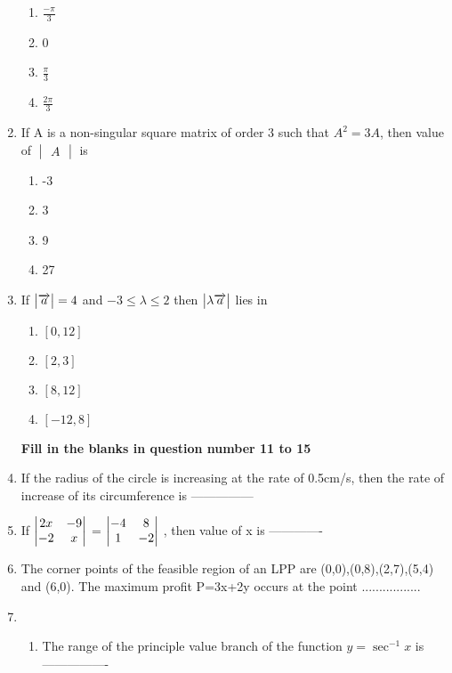 \documentclass[journal,12pt,twocolumn]{IEEEtran}
\renewcommand\thesection{\arabic{section}}
\begin{document}
\begin{enumerate}[label=\thesection.\arabic*.,ref=\thesection.\theenumi]
\begin{enumerate}
    \item $\frac{-\pi}{3}$
    \item 0
    \item $\frac{\pi}{3}$
    \item $\frac{2\pi}{3}$
\end{enumerate}

\item  If A is a non-singular square matrix of order 3 such that $ A^2 =3A $, then value of  $\begin{vmatrix}A \end{vmatrix}$ is

\begin{enumerate}
    \item -3
     \item 3
     \item 9
     \item 27
\end{enumerate}
\item  If $\begin{vmatrix}\overrightarrow{a}\end{vmatrix} = 4 $ and  $ -3\leq \lambda \leq 2 $ then $\begin{vmatrix}\lambda \overrightarrow{a}\end{vmatrix} $ lies in

\begin{enumerate}
    \item $\left[0,12\right]$
    \item $\left[2,3\right]$
    \item $\left[8,12\right]$
    \item $\left[-12,8\right]$
\end{enumerate}
\pagebreak
\textbf{Fill in the blanks in question number 11 to 15}\\

\item  If the radius of the circle is increasing at the rate of 0.5cm/s, then the rate of increase of its circumference is ---------------\\
\item  If $\begin{vmatrix}2x & -9 \\ -2 & x\end{vmatrix} $ = $\begin{vmatrix}-4 & 8 \\ 1 & -2 \end{vmatrix}$ , then value of x is -------------\\
\item  The corner points of the feasible region of an LPP are (0,0),(0,8),(2,7),(5,4) and (6,0). The maximum profit P=3x+2y occurs at the point .................\\
\item \begin{enumerate} \item The range of the principle value branch of the function $ y= \sec^{-1}x $ is ----------------
    

\end{enumerate}
\end{enumerate}
\end{document}
